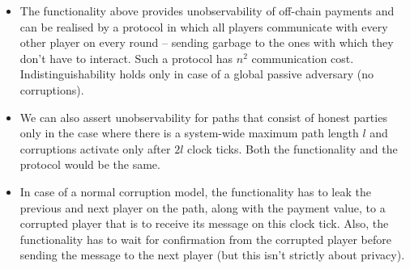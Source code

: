\begin{itemize}
  \item The functionality above provides unobservability of off-chain payments
  and can be realised by a protocol in which all players communicate with every
  other player on every round -- sending garbage to the ones with which they
  don't have to interact. Such a protocol has $n^2$ communication cost.
  Indistinguishability holds only in case of a global passive adversary (no
  corruptions).
  \item We can also assert unobservability for paths that consist of honest
  parties only in the case where there is a system-wide maximum path length $l$
  and corruptions activate only after $2l$ clock ticks. Both the functionality
  and the protocol would be the same.
  \item In case of a normal corruption model, the functionality has to leak the
  previous and next player on the path, along with the payment value, to a
  corrupted player that is to receive its message on this clock tick. Also, the
  functionality has to wait for confirmation from the corrupted player before
  sending the message to the next player (but this isn't strictly about
  privacy).
\end{itemize}
